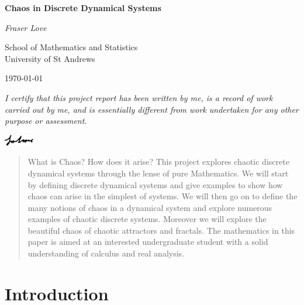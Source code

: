 \documentclass[11pt,a4paper,oneside]{memoir}
\theoremstyle{plain}
\theoremstyle{definition}
\begin{document}
\begin{titlingpage}
    \centering
        \vspace*{3cm}
 
        \Huge
        \textbf{Chaos in Discrete Dynamical Systems}
             
        \vspace{1.5cm}
        
        \LARGE
        \textit{Fraser Love}
             
        \vspace{1.5cm}
             
        \Large
        School of Mathematics and Statistics\\
        University of St Andrews\\

        \vfill

        {\large \today\par}
 \end{titlingpage}

\noindent\textit{I certify that this project report has been written by me, is a record of work carried out by me, and is essentially different from work undertaken for any other purpose or assessment.}

\vspace{0cm}\hspace{12.8cm}\includegraphics[width=1.3cm]{signature}

\begin{abstract}
    \noindent What is Chaos? How does it arise? This project explores chaotic discrete dynamical systems through the lense of pure Mathematics. We will start by defining discrete dynamical systems and give examples to show how chaos can arise in the simplest of systems. We will then go on to define the many notions of chaos in a dynamical system and explore numerous examples of chaotic discrete systems. Moreover we will explore the beautiful chaos of chaotic attractors and fractals. The mathematics in this paper is aimed at an interested undergraduate student with a solid understanding of calculus and real analysis.
\end{abstract}

\tableofcontents

\chapter{Introduction}
\end{document}
